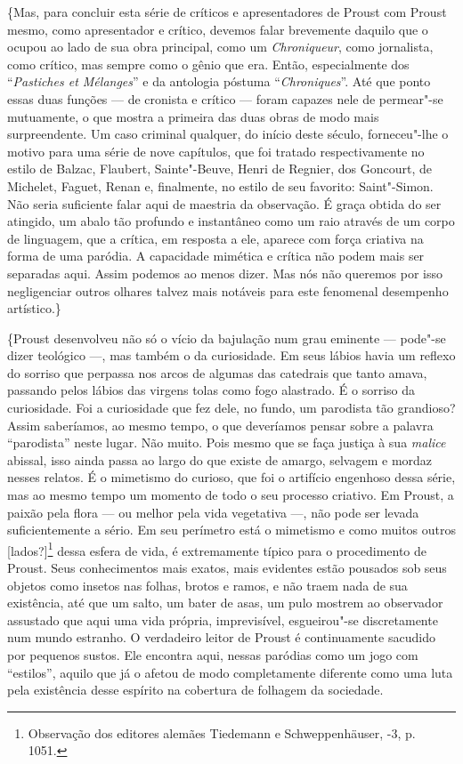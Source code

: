 \{Mas, para concluir esta série de críticos e apresentadores de Proust
com Proust mesmo, como apresentador e crítico, devemos falar brevemente
daquilo que o ocupou ao lado de sua obra principal, como um
\emph{Chroniqueur}, como jornalista, como crítico, mas sempre como o
gênio que era. Então, especialmente dos ``\emph{Pastiches et Mélanges}'' e
da antologia póstuma ``\emph{Chroniques}''. Até que ponto essas duas
funções --- de cronista e crítico --- foram capazes nele de permear"-se
mutuamente, o que mostra a primeira das duas obras de modo mais
surpreendente. Um caso criminal qualquer, do início deste século,
forneceu"-lhe o motivo para uma série de nove capítulos, que foi
tratado respectivamente no estilo de Balzac, Flaubert, Sainte"-Beuve,
Henri de Regnier, dos Goncourt, de Michelet, Faguet, Renan e,
finalmente, no estilo de seu favorito: Saint"-Simon. Não seria suficiente
falar aqui de maestria da observação. É graça obtida do ser atingido, um
abalo tão profundo e instantâneo como um raio através de um corpo
de linguagem, que a crítica, em resposta a ele, aparece com força
criativa na forma de uma paródia. A capacidade mimética e crítica não
podem mais ser separadas aqui. Assim podemos ao menos dizer. Mas nós não
queremos por isso negligenciar outros olhares talvez mais notáveis para
este fenomenal desempenho artístico.\}

\{Proust desenvolveu não só o vício da bajulação num grau eminente ---
pode"-se dizer teológico ---, mas também o da curiosidade. Em seus lábios
havia um reflexo do sorriso que perpassa nos arcos de algumas das
catedrais que tanto amava, passando pelos lábios das virgens tolas como
fogo alastrado. É o sorriso da curiosidade. Foi a curiosidade que fez dele, no
fundo, um parodista tão grandioso? Assim saberíamos, ao mesmo
tempo, o que deveríamos pensar sobre a palavra ``parodista'' neste lugar.
Não muito. Pois mesmo que se faça justiça à sua \emph{malice} abissal,
isso ainda passa ao largo do que existe de amargo, selvagem e mordaz nesses relatos. É
o mimetismo do curioso, que foi o artifício engenhoso dessa série, mas ao mesmo tempo um momento de todo o seu processo
criativo. Em Proust, a paixão pela flora --- ou melhor pela vida vegetativa ---,
não pode ser levada suficientemente a sério. Em seu perímetro está o
mimetismo e como muitos outros {[}lados?{]}\footnote{Observação dos
  editores alemães Tiedemann e Schweppenhäuser, -3,
  p. 1051. \versal{[N. E.]}} dessa esfera de vida, é extremamente típico para o
procedimento de Proust. Seus conhecimentos mais exatos, mais evidentes
estão pousados sob seus objetos como insetos nas folhas, brotos e
ramos, e não traem nada de sua existência, até que um salto, um bater
de asas, um pulo mostrem ao observador assustado que aqui uma vida própria,
imprevisível, esgueirou"-se discretamente num mundo
estranho. O verdadeiro leitor de Proust é continuamente sacudido por
pequenos sustos. Ele encontra aqui, nessas paródias como um jogo com
``estilos'', aquilo que já o afetou de modo completamente diferente como
uma luta pela existência desse espírito na cobertura de folhagem da
sociedade.

